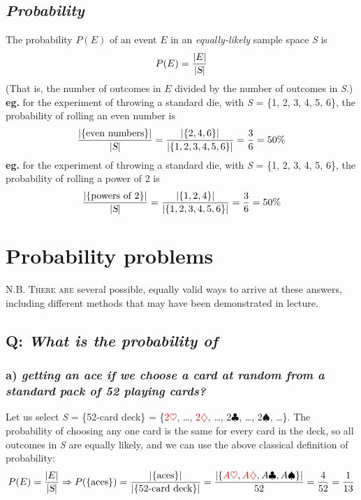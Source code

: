 \documentclass{article}
\begin{document}
\subsection{\em Probability }
The probability $P(E)$ of an event $E$ in an \textit{equally-likely} sample space \textsl{S} is 
\begin{equation*}
P(E)=\dfrac{|E|}{|\textsl{S}|}
\end{equation*}
(That is, the number of outcomes in $E$ divided by the number of outcomes in \textsl{S}.)\\[1ex]
\textbf{eg.} for the experiment of throwing a standard die, with \textsl{S} = \{1, 2, 3, 4, 5, 6\}, the probability of rolling an even number is
\begin{equation*}
\dfrac{|\{\text{even numbers}\}|}{|\textsl{S}|}=\dfrac{|\{2,4,6\}|}{|\{1,2,3,4,5,6\}|}=\dfrac{3}{6}=50\%
\end{equation*}
\textbf{eg.} for the experiment of throwing a standard die, with \textsl{S} = \{1, 2, 3, 4, 5, 6\}, the probability of rolling a power of 2 is
\begin{equation*}
\dfrac{|\{\text{powers of 2}\}|}{|\textsl{S}|}=\dfrac{|\{1,2,4\}|}{|\{1,2,3,4,5,6\}|}=\dfrac{3}{6}=50\%
\end{equation*}

\section{\sc Probability problems}
\textsc{N.B. There are} several possible, equally valid ways to arrive at these answers, including different methods that may have been demonstrated in lecture.

\subsection*{Q: {\em What is the probability of}}
\subsubsection*{a) {\em getting an ace if we choose a card at random from a standard pack of 52 playing cards?}}
Let us select \textsl{S} = \{52-card deck\} = \{\textcolor{red}{2$\heartsuit$}, \ldots, \textcolor{red}{2$\diamondsuit$}, \ldots, 2$\clubsuit$, \ldots, 2$\spadesuit$, \ldots\}. The probability of choosing any one card is the same for every card in the deck, so all outcomes in \textsl{S} are equally likely, and we can use the above classical definition of probability:
\begin{equation*}
P(E)=\dfrac{|E|}{|\textsl{S}|}\Rightarrow P(\{\text{aces}\})=\dfrac{|\{\text{aces}\}|}{|\{\text{52-card deck}\}|} =\dfrac{|\{\textcolor{red}{A\heartsuit},\textcolor{red}{A\diamondsuit},A\clubsuit,A\spadesuit\}|}{52}
=\dfrac{4}{52}=\dfrac{1}{13}
\end{equation*}
\end{document}
